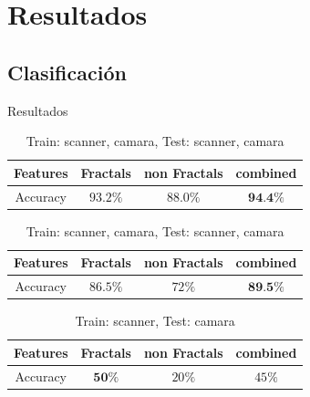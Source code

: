 \documentclass{beamer}
\begin{document}
\section{Resultados}

\subsection{Clasificaci\'on}
\begin{frame}
{\huge Resultados}
\begin{center}
\begin{table}[htb]
\centering
\begin{tabular}{|c|c|c|c|}
    Features & Fractals & non Fractals & combined\\
    \hline
    Accuracy  & $93.2\%$ & $88.0\%$ & $\textbf{94.4\%}$\\
\end{tabular}
\caption{Train: scanner, Test: scanner}
\label{table:tableFirstTest}

\begin{table}[ht!b]
\centering
\begin{tabular}{|c|c|c|c|}
    Features & Fractals & non Fractals & combined\\
    \hline
    Accuracy  & $86.5\%$ & $72\%$ & $\textbf{89.5\%}$\\
\end{tabular}
\caption{Train: scanner, camara, Test: scanner, camara}
\label{table:tableRobustnessTest1}
\end{table}
\end{table}

\begin{table}[htb]
\centering
\begin{tabular}{|c|c|c|c|}
    Features & Fractals & non Fractals & combined\\
    \hline
    Accuracy  & $\textbf{50}\%$ & $20\%$ & $45\%$\\
\end{tabular}
\caption{Train: scanner, Test: camara}
\label{table:tableRobustnessTest2}
\end{table}
\end{center}
\end{frame}
\end{document}
